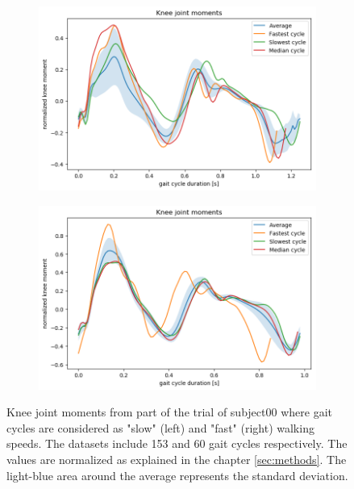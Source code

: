 \begin{figure}
     \centering
     \begin{subfigure}[b]{0.45\textwidth}
         \centering
         \includegraphics[width=\textwidth]{img/results/20190429_06_moments_slow_walk.png}
     \end{subfigure}
     \hfill
     \begin{subfigure}[b]{0.45\textwidth}
         \centering
         \includegraphics[width=\textwidth]{img/results/20190429_06_moments_fast_walk.png}
     \end{subfigure}
    \caption{Knee joint moments from part of the trial of subject00 where gait cycles are considered as "slow" (left) and "fast" (right) walking speeds. The datasets include 153 and 60 gait cycles respectively. The values are normalized as explained in the chapter \ref{sec:methods}. The light-blue area around the average represents the standard deviation.}
    \label{fig:knee-joint-moments-stat-compl}
\end{figure}
